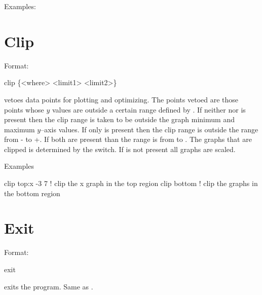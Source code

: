 Examples:


\section{Clip}
\label{s:clip}

Format:
\begin{example}
  clip \{<where> <limit1> <limit2>\}
\end{example}

\vskip 0.2in 
 vetoes data points for plotting and optimizing. The points
vetoed are those points whose $y$ values are outside a certain range
defined by  . If neither  nor
 is present then the clip range is taken to be outside
the graph minimum and maximum $y$--axis values. If only 
is present then the clip range is outside the range from
- to +. If both are present than the range
is from  to .  The graphs that are clipped
is determined by the  switch.  If  is not
present all graphs are scaled.

Examples
\begin{example}
  clip top:x -3  7  ! clip the x graph in the top region
  clip bottom       ! clip the graphs in the bottom region
\end{example}

\section{Exit}
\label{s:exit}

Format:
\begin{example}
  exit
\end{example}

\vskip 0.2in
 exits the program. Same as .


